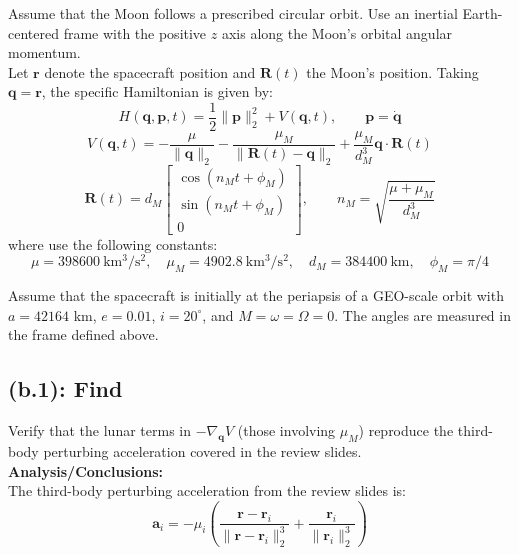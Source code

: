 \documentclass[titlepage]{article}
\begin{document}
Assume that the Moon follows a prescribed circular orbit. Use an inertial Earth-centered frame with the positive $z$ axis along the Moon's orbital angular momentum. \\

Let $\boldsymbol{r}$ denote the spacecraft position and $\boldsymbol{R}(t)$ the Moon's position. Taking $\boldsymbol{q}=\boldsymbol{r}$, the specific Hamiltonian is given by:
\begin{equation}
	H(\boldsymbol{q},\boldsymbol{p},t)=\frac{1}{2}\|\boldsymbol{p}\|_2^2+V(\boldsymbol{q},t),\qquad\boldsymbol{p}=\dot{\boldsymbol{q}}
\end{equation}
\begin{equation}
	V(\boldsymbol{q},t)=-\frac{\mu}{\|\boldsymbol{q}\|_2}-\frac{\mu_M}{\|\boldsymbol{R}(t)-\boldsymbol{q}\|_2}+\frac{\mu_M}{d_M^3}\boldsymbol{q}\cdot\boldsymbol{R}(t)
\end{equation}
\begin{equation}
	\boldsymbol{R}(t)=d_M
	\begin{bmatrix}
		\cos(n_Mt+\phi_M) \\
		\sin(n_Mt+\phi_M) \\
		0
	\end{bmatrix},\qquad n_M=\sqrt{\frac{\mu+\mu_M}{d_M^3}}
\end{equation}
where use the following constants:
\begin{equation}
	\mu=398600\ \mathrm{km^3/s^2},\quad\mu_M=4902.8\ \mathrm{km^3/s^2},\quad d_M=384400\ \mathrm{km},\quad\phi_M=\pi/4
\end{equation}

Assume that the spacecraft is initially at the periapsis of a GEO-scale orbit with $a=42164$ km, $e=0.01$, $i=20^\circ$, and $M=\omega=\Omega=0$. The angles are measured in the frame defined above.

\subsection*{(b.1): Find}

Verify that the lunar terms in $-\nabla_{\boldsymbol{q}}V$ (those involving $\mu_M$) reproduce the third-body perturbing acceleration covered in the review slides. \\

\textbf{Analysis/Conclusions:}\\

The third-body perturbing acceleration from the review slides is:
\begin{equation}
	\boldsymbol{a}_i=-\mu_i\left(\frac{\boldsymbol{r}-\boldsymbol{r}_i}{\|\boldsymbol{r}-\boldsymbol{r}_i\|_2^3}+\frac{\boldsymbol{r}_i}{\|\boldsymbol{r}_i\|_2^3}\right)
\end{equation}
\end{document}
